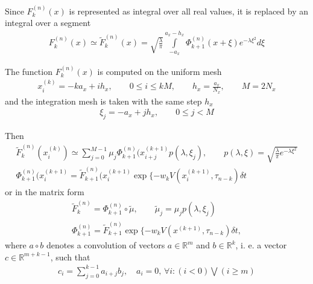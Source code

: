 \documentclass[11pt,a4paper]{extarticle}
\begin{document}
Since $F_k^{(n)}(x)$ is represented as integral over all real values, it is replaced by an integral over a segment
\begin{equation}
    \begin{aligned}
    \nonumber
    F_k^{(n)}(x) \simeq \tilde F_k^{(n)}(x) = \sqrt{\frac\lambda\pi} \int\limits_{-a_x}^{a_x - h_x} \Phi_{k+1}^{(n)}(x + \xi) e^{-\lambda \xi^2} d\xi
    \end{aligned}
\end{equation}

The function $F_k^{(n)}(x)$ is computed on the uniform mesh 
\begin{equation}
    \begin{aligned}
    \nonumber
    x_i^{(k)} = -ka_x + ih_x, \qquad 0 \leq i \leq kM, \qquad h_x = \frac{a_x}{N_x}, \qquad M = 2N_x
    \end{aligned}
\end{equation}
and the integration mesh is taken with the same step $h_x$
\begin{equation}
    \begin{aligned}
    \nonumber
    \xi_j = -a_x + jh_x, \qquad 0 \leq j < M
    \end{aligned}
\end{equation}

Then
\begin{equation}
    \begin{aligned}
    \nonumber
    \tilde F_k^{(n)} (x_i^{(k)}) \simeq \sum\limits_{j=0}^{M-1} \mu_j \Phi_{k+1}^{(n)}(x_{i+j}^{(k+1)} p(\lambda, \xi_j), \qquad p(\lambda, \xi) = \sqrt{\frac\lambda\pi e^{-\lambda \xi^2}} \\
    \Phi_{k+1}^{(n)}(x_i^{(k+1)} = \tilde F_{k+1}^{(n)}(x_i^{(k+1)} \exp\{ -w_k V(x_i^{(k+1)}, \tau_{n-k}) \delta t
    \end{aligned}
\end{equation}
or in the matrix form
\begin{equation}
    \begin{aligned}
    \nonumber
    \tilde F_k^{(n)} = \Phi_{k+1}^{(n)} \circ \tilde\mu, \qquad \tilde\mu_j = \mu_j p(\lambda, \xi_j) \\
    \Phi_{k+1}^{(n)} = \tilde F_{k+1}^{(n)} \exp\{ -w_k V(x^{(k+1)}, \tau_{n-k}) \delta t,
    \end{aligned}
\end{equation}
where $a\circ b$ denotes a convolution of vectors $a \in \mathbb R^m$ and $b \in \mathbb R^k$, i. e. a vector $c \in \mathbb R^{m+k-1}$, such that
\begin{equation}
    \begin{aligned}
    \nonumber
    c_i = \sum\limits_{j=0}^{k-1} a_{i+j}b_j, \quad a_i = 0,\, \forall i: (i < 0) \bigvee (i \geq m) 
    \end{aligned}
\end{equation}
\end{document}
